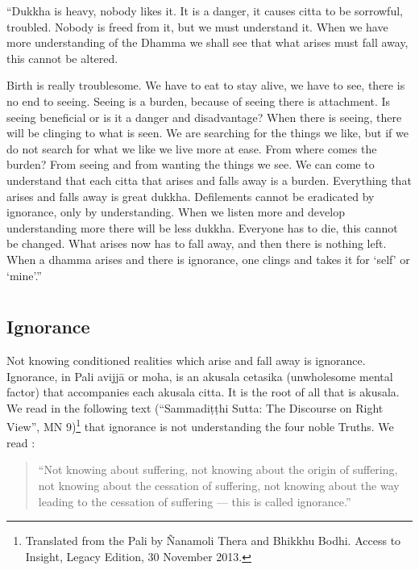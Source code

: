 ``Dukkha is heavy, nobody likes it. It is a danger, it causes citta to
be sorrowful, troubled. Nobody is freed from it, but we must understand
it. When we have more understanding of the Dhamma we shall see that what
arises must fall away, this cannot be altered.

Birth is really troublesome. We have to eat to stay alive, we have to
see, there is no end to seeing. Seeing is a burden, because of seeing
there is attachment. Is seeing beneficial or is it a danger and
disadvantage? When there is seeing, there will be clinging to what is
seen. We are searching for the things we like, but if we do not search
for what we like we live more at ease. From where comes the burden? From
seeing and from wanting the things we see. We can come to understand
that each citta that arises and falls away is a burden. Everything that
arises and falls away is great dukkha. Defilements cannot be eradicated
by ignorance, only by understanding. When we listen more and develop
understanding more there will be less dukkha. Everyone has to die, this
cannot be changed. What arises now has to fall away, and then there is
nothing left. When a dhamma arises and there is ignorance, one clings
and takes it for `self' or `mine'.''



\chapter[Ignorance]{}
\section*{Ignorance}


Not knowing conditioned realities which arise and fall away is
ignorance. Ignorance, in Pali avijjā or moha, is an akusala cetasika
(unwholesome mental factor) that accompanies each akusala citta. It is
the root of all that is akusala. We read in the following text
(``Sammadiṭṭhi Sutta: The Discourse on Right View'', MN
9)\footnote{Translated from the
Pali by Ñanamoli Thera and Bhikkhu Bodhi. Access to Insight, Legacy
Edition, 30 November 2013.} that ignorance is not
understanding the four noble Truths. We read :

\begin{quote}
``Not knowing about suffering, not knowing about the origin of
suffering, not knowing about the cessation of suffering, not knowing
about the way leading to the cessation of suffering --- this is called
ignorance.''
\end{quote}


